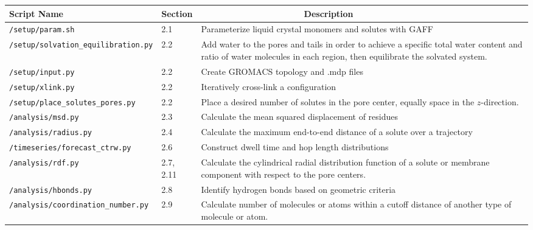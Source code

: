 \documentclass{article}
\begin{document}
  \begin{table}[htb!]
  \centering
  \begin{tabular}{|A|B|C|}
  \hline
  \textbf{Script Name} & \textbf{Section} & ~~~~~~~~~~~~~~~~~~~~~\textbf{Description} \\
  \hline

  \texttt{/setup/param.sh} & 2.1 & Parameterize liquid 
  crystal monomers and solutes with GAFF \\ \hline

  \texttt{/setup/solvation\_equilibration.py} & 2.2 & Add water to the pores and tails
  in order to achieve a specific total water content and ratio of water molecules in each
  region, then equilibrate the solvated system. \\ \hline
  
  \texttt{/setup/input.py} & 2.2 & Create GROMACS topology and .mdp files \\ \hline
  
  \texttt{/setup/xlink.py} & 2.2 & Iteratively cross-link a configuration \\ \hline
  
  \texttt{/setup/place\_solutes\_pores.py} & 2.2 & Place a desired number of solutes
  in the pore center, equally space in the $z$-direction. \\ \hline
  
  \texttt{/analysis/msd.py} & 2.3 & Calculate the mean squared displacement of residues \\ \hline
  
  \texttt{/analysis/radius.py} & 2.4 & Calculate the maximum end-to-end distance of a solute over a trajectory \\ \hline
  
  \texttt{/timeseries/forecast\_ctrw.py} & 2.6 & Construct dwell time and hop length distributions \\ \hline 
  
  \texttt{/analysis/rdf.py} & 2.7, 2.11 & Calculate the cylindrical radial distribution function of
  a solute or membrane component with respect to the pore centers. \\ \hline
  
  \texttt{/analysis/hbonds.py} & 2.8 & Identify hydrogen bonds based on geometric criteria \\ \hline
  
  \texttt{/analysis/coordination\_number.py} & 2.9 & Calculate number of molecules or atoms within a
  cutoff distance of another type of molecule or atom. \\ \hline
  

\end{tabular}
\end{table}
\end{document}
